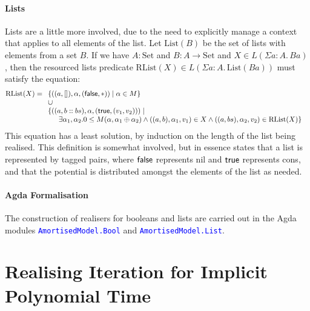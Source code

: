 \documentclass[acmsmall,screen]{acmart}
\newcommand{\Set}{\mathrm{Set}}
\newcommand{\AgdaModule}[1]{\textcolor{blue}{\tt #1}}
\begin{document}
\paragraph{Lists} Lists are a little more involved, due to the need to
explicitly manage a context that applies to all elements of the
list. Let $\mathrm{List}(B)$ be the set of lists with elements from a
set $B$. If we have $A : \Set$ and $B : A \to \Set$ and
$X \in L(\Sigma a:A.\, B a)$, then the resourced lists predicate
$\mathrm{RList}(X) \in L(\Sigma a : A.\, \mathrm{List}(B a))$ must
satisfy the equation:
\begin{displaymath}
  \mathrm{RList}(X) =
  \begin{array}[t]{l}
    \{ ((a, []), \alpha, (\synFalse, *)) \mid \alpha \in M \} \\
    \cup \\
    \{ \begin{array}[t]{@{}l}
         ((a, b :: bs), \alpha, (\synTrue, (v_1, v_2))) \mid \\
         \quad \exists \alpha_1, \alpha_2. 0 \leq M(\alpha, \alpha_1 \oplus \alpha_2) \land ((a, b), \alpha_1, v_1) \in X \land ((a, bs), \alpha_2, v_2) \in \mathrm{RList}(X) \}
       \end{array}
  \end{array}
\end{displaymath}
This equation has a least solution, by induction on the length of the
list being realised. This definition is somewhat involved, but in
essence states that a list is represented by tagged pairs, where
$\mathsf{false}$ represents nil and $\mathsf{true}$ represents cons, and that
the potential is distributed amongst the elements of the list as
needed.

\paragraph{Agda Formalisation} The construction of realisers for
booleans and lists are carried out in the Agda modules
\AgdaModule{AmortisedModel.Bool} and \AgdaModule{AmortisedModel.List}.

\section{Realising Iteration for Implicit Polynomial Time}
\label{sec:realising-iteration}
\end{document}
